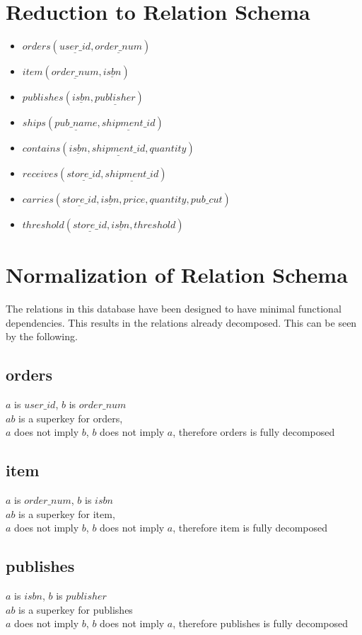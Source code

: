 \documentclass[titlepage, oneside]{article}
\begin{document}
    \section{Reduction to Relation Schema}
        \begin{itemize}
            \item $orders(\underline{user\_id}, \underline{order\_num})$
            \item $item(\underline{order\_num}, \underline{isbn})$
            \item $publishes(\underline{isbn}, \underline{publisher})$
            \item $ships(\underline{pub\_name}, \underline{shipment\_id})$
            \item $contains(\underline{isbn}, \underline{shipment\_id}, quantity)$
            \item $receives(\underline{store\_id}, \underline{shipment\_id})$
            \item $carries(\underline{store\_id}, \underline{isbn}, price, quantity, pub\_cut)$
            \item $threshold(\underline{store\_id}, \underline{isbn}, threshold)$
        \end{itemize}
    \section{Normalization of Relation Schema}
        The relations in this database have been designed to have minimal functional dependencies. This results in the relations already decomposed. This can be seen by the following.
        \subsection{orders}
            $a$ is $user\_id$, $b$ is $order\_num$ \\
            $ab$ is a superkey for orders, \\ 
            $a$ does not imply $b$, $b$ does not imply $a$, therefore orders is fully decomposed
        \subsection{item}
            $a$ is $order\_num$, $b$ is $isbn$ \\
            $ab$ is a superkey for item, \\ 
            $a$ does not imply $b$, $b$ does not imply $a$, therefore item is fully decomposed
        \subsection{publishes}
            $a$ is $isbn$, $b$ is $publisher$ \\
            $ab$ is a superkey for publishes \\ 
            $a$ does not imply $b$, $b$ does not imply $a$, therefore publishes is fully decomposed
\end{document}
